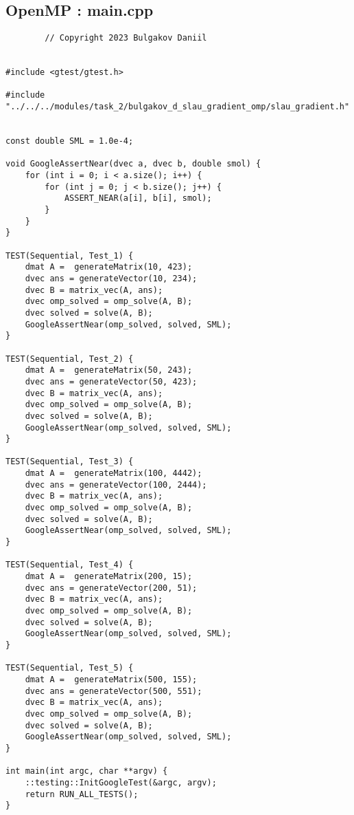 \documentclass[14pt, russian]{extarticle}
\begin{document}
        \subsection{OpenMP : main.cpp}
        \begin{lstlisting}
        // Copyright 2023 Bulgakov Daniil


#include <gtest/gtest.h>

#include "../../../modules/task_2/bulgakov_d_slau_gradient_omp/slau_gradient.h"


const double SML = 1.0e-4;

void GoogleAssertNear(dvec a, dvec b, double smol) {
    for (int i = 0; i < a.size(); i++) {
        for (int j = 0; j < b.size(); j++) {
            ASSERT_NEAR(a[i], b[i], smol);
        }
    }
}

TEST(Sequential, Test_1) {
    dmat A =  generateMatrix(10, 423);
    dvec ans = generateVector(10, 234);
    dvec B = matrix_vec(A, ans);
    dvec omp_solved = omp_solve(A, B);
    dvec solved = solve(A, B);
    GoogleAssertNear(omp_solved, solved, SML);
}

TEST(Sequential, Test_2) {
    dmat A =  generateMatrix(50, 243);
    dvec ans = generateVector(50, 423);
    dvec B = matrix_vec(A, ans);
    dvec omp_solved = omp_solve(A, B);
    dvec solved = solve(A, B);
    GoogleAssertNear(omp_solved, solved, SML);
}

TEST(Sequential, Test_3) {
    dmat A =  generateMatrix(100, 4442);
    dvec ans = generateVector(100, 2444);
    dvec B = matrix_vec(A, ans);
    dvec omp_solved = omp_solve(A, B);
    dvec solved = solve(A, B);
    GoogleAssertNear(omp_solved, solved, SML);
}

TEST(Sequential, Test_4) {
    dmat A =  generateMatrix(200, 15);
    dvec ans = generateVector(200, 51);
    dvec B = matrix_vec(A, ans);
    dvec omp_solved = omp_solve(A, B);
    dvec solved = solve(A, B);
    GoogleAssertNear(omp_solved, solved, SML);
}

TEST(Sequential, Test_5) {
    dmat A =  generateMatrix(500, 155);
    dvec ans = generateVector(500, 551);
    dvec B = matrix_vec(A, ans);
    dvec omp_solved = omp_solve(A, B);
    dvec solved = solve(A, B);
    GoogleAssertNear(omp_solved, solved, SML);
}

int main(int argc, char **argv) {
    ::testing::InitGoogleTest(&argc, argv);
    return RUN_ALL_TESTS();
}
        \end{lstlisting}
        
\end{document}
